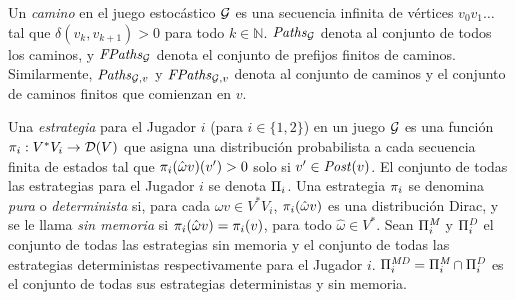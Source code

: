 %
%
Un \emph{camino} en el juego estocástico $\mathcal{G}$ es una secuencia infinita de vértices $v_0 v_1 \dots$ tal que $\delta(v_k, v_{k+1})>0$ para todo $k \in \mathbb{N}$.
$\mathit{Paths}_{\mathcal{G}}$ denota al conjunto de todos los caminos, y $\mathit{FPaths}_{\mathcal{G}}$ denota el conjunto de prefijos finitos de caminos. 
Similarmente, $\mathit{Paths}_{\mathcal{G},v}$  y  $\mathit{FPaths}_{\mathcal{G},v}$ denota al conjunto de caminos y el conjunto de caminos finitos que comienzan en $v$.
	 

Una \emph{estrategia} para el Jugador $i$ (para $i\in\{1,2\}$) en un juego $\mathcal{G}$ es una función $\pi_{i}: V^*  V_i \rightarrow \mathcal{D}(V)$ que asigna una distribución probabilista a cada secuencia finita de estados tal que $\pi_{i}(\hat{\omega}v)(v') > 0$ solo si $v' \in \mathit{Post}(v)$. El conjunto de todas las estrategias para el Jugador $i$ se denota $\Pi_{i}$. Una estrategia $\pi_{i}$ se denomina \emph{pura} o \emph{determinista} si, para cada $\hat{\omega} v \in V^*V_i$, $\pi_{i}(\hat{\omega} v)$  es una distribución Dirac, y se le llama \emph{sin memoria} si $\pi_{i}(\hat{\omega} v) = \pi_{i}(v)$, para todo $\hat{\omega} \in V^*$.
%
%
Sean $\Pi^{\textit{M}}_{i}$ y $\Pi^{\textit{D}}_{i}$ el conjunto de todas las estrategias sin memoria y el conjunto de todas las estrategias deterministas respectivamente para el Jugador $i$.  $\Pi^{\textit{MD}}_{i} = \Pi^{\textit{M}}_{i} \cap \Pi^{\textit{D}}_{i}$ es el conjunto de todas sus estrategias deterministas y sin memoria.

